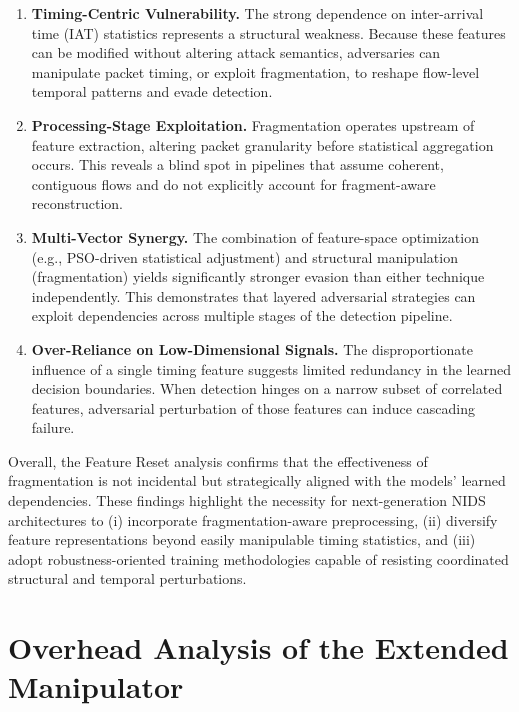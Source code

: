 \begin{enumerate}
    \item \textbf{Timing-Centric Vulnerability.}  
    The strong dependence on inter-arrival time (IAT) statistics represents a structural weakness. Because these features can be modified without altering attack semantics, adversaries can manipulate packet timing, or exploit fragmentation, to reshape flow-level temporal patterns and evade detection.

    \item \textbf{Processing-Stage Exploitation.}  
    Fragmentation operates upstream of feature extraction, altering packet granularity before statistical aggregation occurs. This reveals a blind spot in pipelines that assume coherent, contiguous flows and do not explicitly account for fragment-aware reconstruction.

    \item \textbf{Multi-Vector Synergy.}  
    The combination of feature-space optimization (e.g., PSO-driven statistical adjustment) and structural manipulation (fragmentation) yields significantly stronger evasion than either technique independently. This demonstrates that layered adversarial strategies can exploit dependencies across multiple stages of the detection pipeline.

    \item \textbf{Over-Reliance on Low-Dimensional Signals.}  
    The disproportionate influence of a single timing feature suggests limited redundancy in the learned decision boundaries. When detection hinges on a narrow subset of correlated features, adversarial perturbation of those features can induce cascading failure.
\end{enumerate}

Overall, the Feature Reset analysis confirms that the effectiveness of fragmentation is not incidental but strategically aligned with the models’ learned dependencies. These findings highlight the necessity for next-generation NIDS architectures to (i) incorporate fragmentation-aware preprocessing, (ii) diversify feature representations beyond easily manipulable timing statistics, and (iii) adopt robustness-oriented training methodologies capable of resisting coordinated structural and temporal perturbations.

\section{Overhead Analysis of the Extended Manipulator}
\label{sec:overhead_analysis}

